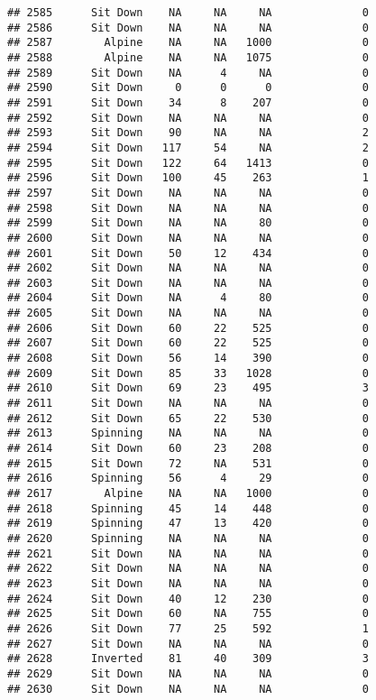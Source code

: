 \documentclass[
]{article}
\begin{document}
\begin{verbatim}
## 2585      Sit Down    NA     NA     NA              0
## 2586      Sit Down    NA     NA     NA              0
## 2587        Alpine    NA     NA   1000              0
## 2588        Alpine    NA     NA   1075              0
## 2589      Sit Down    NA      4     NA              0
## 2590      Sit Down     0      0      0              0
## 2591      Sit Down    34      8    207              0
## 2592      Sit Down    NA     NA     NA              0
## 2593      Sit Down    90     NA     NA              2
## 2594      Sit Down   117     54     NA              2
## 2595      Sit Down   122     64   1413              0
## 2596      Sit Down   100     45    263              1
## 2597      Sit Down    NA     NA     NA              0
## 2598      Sit Down    NA     NA     NA              0
## 2599      Sit Down    NA     NA     80              0
## 2600      Sit Down    NA     NA     NA              0
## 2601      Sit Down    50     12    434              0
## 2602      Sit Down    NA     NA     NA              0
## 2603      Sit Down    NA     NA     NA              0
## 2604      Sit Down    NA      4     80              0
## 2605      Sit Down    NA     NA     NA              0
## 2606      Sit Down    60     22    525              0
## 2607      Sit Down    60     22    525              0
## 2608      Sit Down    56     14    390              0
## 2609      Sit Down    85     33   1028              0
## 2610      Sit Down    69     23    495              3
## 2611      Sit Down    NA     NA     NA              0
## 2612      Sit Down    65     22    530              0
## 2613      Spinning    NA     NA     NA              0
## 2614      Sit Down    60     23    208              0
## 2615      Sit Down    72     NA    531              0
## 2616      Spinning    56      4     29              0
## 2617        Alpine    NA     NA   1000              0
## 2618      Spinning    45     14    448              0
## 2619      Spinning    47     13    420              0
## 2620      Spinning    NA     NA     NA              0
## 2621      Sit Down    NA     NA     NA              0
## 2622      Sit Down    NA     NA     NA              0
## 2623      Sit Down    NA     NA     NA              0
## 2624      Sit Down    40     12    230              0
## 2625      Sit Down    60     NA    755              0
## 2626      Sit Down    77     25    592              1
## 2627      Sit Down    NA     NA     NA              0
## 2628      Inverted    81     40    309              3
## 2629      Sit Down    NA     NA     NA              0
## 2630      Sit Down    NA     NA     NA              0

\end{verbatim}
\end{document}
